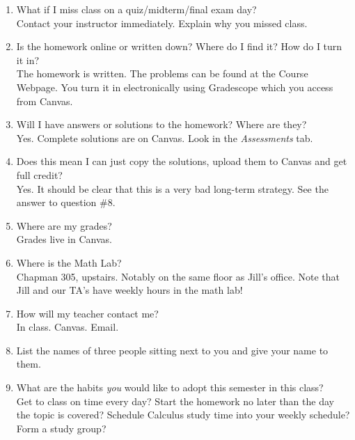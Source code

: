\documentclass[11pt,fleqn]{article}
\begin{document}
\begin{enumerate}
\item What if I miss class on a quiz/midterm/final exam day?\\
Contact your instructor immediately. Explain why you missed class. 
\vfill

\item Is the homework online or written down? Where do I find it? How do I turn it in?\\
The homework is written. The problems can be found at the Course Webpage. You turn it in electronically using Gradescope which you access from Canvas.
\vfill
\item Will I have answers or solutions to the homework? Where are they?\\
Yes. Complete solutions are on Canvas. Look in the \emph{Assessments} tab.
\vfill
\item Does this mean I can just copy the solutions, upload them to Canvas and get full credit? \\
Yes. 
It should be clear that this is a very bad long-term strategy. See the answer to question \#8.
\vfill
\item Where are my grades?\\
Grades live in Canvas.
\vfill

\item Where is the Math Lab?\\
Chapman 305, upstairs. Notably on the same floor as Jill's office. Note that Jill and our TA's have weekly hours in the math lab!
\vfill
\item How will my teacher contact me? \\
In class. Canvas. Email.
\vfill
\item List the names of three people sitting next to you and give your name to them.
\vfill
\item What are the habits \emph{you} would like to adopt this semester in this class?\\
Get to class on time every day? Start the homework no later than the day the topic is covered? Schedule Calculus study time into your weekly schedule? Form a study group?
\end{enumerate}
\end{document}
